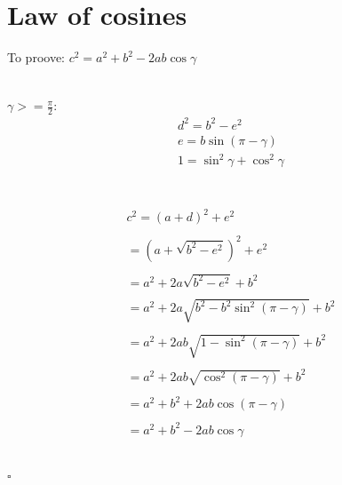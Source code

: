 \documentclass[a4paper]{article}
\begin{document}
\section{Law of cosines}
To proove: $c^2 = a^2+b^2-2ab\cos\gamma$
\\\\\\
$\gamma>=\frac{\pi}{2}:$
\begin{align}
d^2=b^2-e^2\\
e=b\sin(\pi-\gamma)\\
1=\sin^2\gamma+\cos^2\gamma
\end{align}
\\\\
\begin{align*}
c^2 = (a+d)^2+e^2
\\\\
=(a+\sqrt{b^2-e^2})^2+e^2
\\\\
=a^2+2a\sqrt{b^2-e^2}+b^2
\\\\
=a^2+2a\sqrt{b^2-b^2\sin^2(\pi-\gamma)}+b^2
\\\\
=a^2+2ab\sqrt{1-\sin^2(\pi-\gamma)}+b^2
\\\\
=a^2+2ab\sqrt{\cos^2(\pi-\gamma)}+b^2
\\\\
=a^2+b^2+2ab\cos(\pi-\gamma)
\\\\
=a^2+b^2-2ab\cos\gamma
\end{align*}
\\\\
$\square$
\newpage
\end{document}
